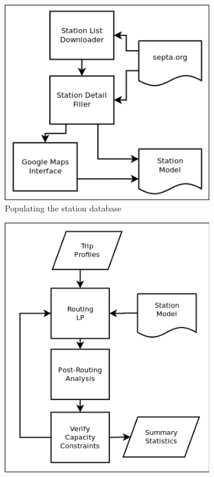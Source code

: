 \begin{figure}[htp]
  \centering
  \begin{subfigure}{.504\textwidth}
    \centering
    \includegraphics[width=\textwidth]{graphics/septa-db.png}
    \caption{Populating the station database}
    \label{septa-db}
  \end{subfigure}
    \begin{subfigure}{.394\textwidth}
    \centering
    \includegraphics[width=\textwidth]{graphics/septa.png}

\end{subfigure}
\end{figure}
